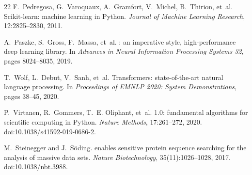 \documentclass[11pt,a4paper]{article}
\begin{document}
\begin{thebibliography}{22}
F.~Pedregosa, G.~Varoquaux, A.~Gramfort, V.~Michel, B.~Thirion, et~al.
\newblock Scikit-learn: machine learning in {P}ython.
\newblock \emph{Journal of Machine Learning Research}, 12:2825--2830, 2011.

A.~Paszke, S.~Gross, F.~Massa, et~al.
: an imperative style, high-performance deep learning library.
\newblock In \emph{Advances in Neural Information Processing Systems 32}, pages
  8024--8035, 2019.

T.~Wolf, L.~Debut, V.~Sanh, et~al.
\newblock Transformers: state-of-the-art natural language processing.
\newblock In \emph{Proceedings of EMNLP 2020: System Demonstrations}, pages 38--45, 2020.

P.~Virtanen, R.~Gommers, T.~E. Oliphant, et~al.
 1.0: fundamental algorithms for scientific computing in {P}ython.
\newblock \emph{Nature Methods}, 17:261--272, 2020.
\newblock doi:10.1038/s41592-019-0686-2.

M.~Steinegger and J.~S\"oding.
 enables sensitive protein sequence searching for the analysis of
  massive data sets.
\newblock \emph{Nature Biotechnology}, 35(11):1026--1028, 2017.
\newblock doi:10.1038/nbt.3988.

\end{thebibliography}
\end{document}
